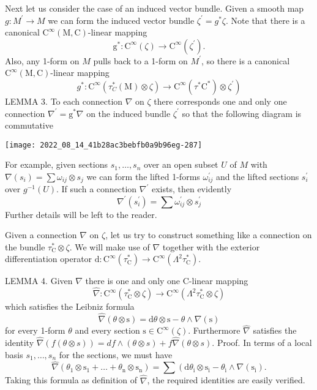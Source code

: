 \documentclass[10pt]{article}
\begin{document}
Next let us consider the case of an induced vector bundle. Given a smooth map $g: M^{\prime} \rightarrow M$ we can form the induced vector bundle $\zeta^{\prime}=g^{*} \zeta$. Note that there is a canonical $\mathrm{C}^{\infty}(\mathrm{M}, \mathrm{C})$-linear mapping
$$
\mathrm{g}^{*}: \mathrm{C}^{\infty}(\zeta) \rightarrow \mathrm{C}^{\infty}\left(\zeta^{\prime}\right) .
$$
Also, any 1-form on $M$ pulls back to a 1-form on $M^{\prime}$, so there is a canonical $\mathrm{C}^{\infty}(\mathrm{M}, \mathrm{C})$-linear mapping
$$
\left.g^{*}: \mathrm{C}^{\infty}\left(\tau_{C}^{*}(\mathrm{M}) \otimes \zeta\right) \rightarrow \mathrm{C}^{\infty}\left(\tau^{*} \mathrm{C}^{*}\right) \otimes \zeta^{\prime}\right)
$$
LEMMA 3. To each connection $\nabla$ on $\zeta$ there corresponds one and only one connection $\nabla^{\prime}=\mathrm{g}^{*} \nabla$ on the induced bundle $\zeta^{\prime}$ so that the following diagram is commutative

\texttt{[image: 2022\_08\_14\_41b28ac3bebfb0a9b96eg-287]}

For example, given sections $s_{1}, \ldots, s_{n}$ over an open subset $U$ of $M$ with $\nabla\left(s_{i}\right)=\sum \omega_{i j} \otimes s_{j}$ we can form the lifted 1-forms $\omega_{i j}^{\prime}$ and the lifted sections $s_{i}^{\prime}$ over $g^{-1}(U)$. If such a connection $\nabla^{\prime}$ exists, then evidently
$$
\nabla^{\prime}\left(s_{i}^{\prime}\right)=\sum \omega_{i j}^{\prime} \otimes s_{j}^{\prime}
$$
Further details will be left to the reader.

Given a connection $\nabla$ on $\zeta$, let us try to construct something like a connection on the bundle $\tau_{\mathrm{C}}^{*} \otimes \zeta$. We will make use of $\nabla$ together with the exterior differentiation operator $\mathrm{d}: \mathrm{C}^{\infty}\left(\tau_{\mathrm{C}}^{*}\right) \rightarrow \mathrm{C}^{\infty}\left(\Lambda^{2} \tau_{\mathrm{C}}^{*}\right)$.

LEMMA 4. Given $\nabla$ there is one and only one C-linear mapping
$$
\hat{\nabla}: \mathrm{C}^{\infty}\left(\tau_{\mathrm{C}}^{*} \otimes \zeta\right) \rightarrow \mathrm{C}^{\infty}\left(\Lambda^{2} \tau_{\mathrm{C}}^{*} \otimes \zeta\right)
$$
which satisfies the Leibniz formula
$$
\hat{\nabla}(\theta \otimes \mathrm{s})=\mathrm{d} \theta \otimes \mathrm{s}-\theta \wedge \nabla(\mathrm{s})
$$
for every 1-form $\theta$ and every section $\mathrm{s} \in \mathrm{C}^{\infty}(\zeta)$. Furthermore $\hat{\nabla}$ satisfies the identity $\hat{\nabla}(f(\theta \otimes s))=d f \wedge(\theta \otimes s)+f \hat{\nabla}(\theta \otimes s)$. Proof. In terms of a local basis $s_{1}, \ldots, s_{n}$ for the sections, we must have
$$
\hat{\nabla}\left(\theta_{1} \otimes \mathrm{s}_{1}+\ldots+\theta_{\mathrm{n}} \otimes \mathrm{s}_{\mathrm{n}}\right)=\sum\left(\mathrm{d} \theta_{\mathrm{i}} \otimes \mathrm{s}_{\mathrm{i}}-\theta_{\mathrm{i}} \wedge \nabla\left(\mathrm{s}_{\mathrm{i}}\right) .\right.
$$
Taking this formula as definition of $\hat{\nabla}$, the required identities are easily verified.
\end{document}
